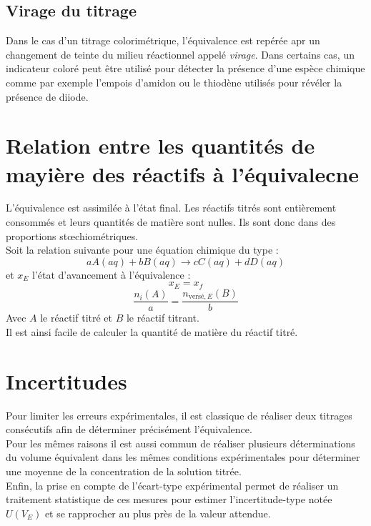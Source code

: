 \documentclass[a4paper,12pt,fleqn]{scrartcl}%
\begin{document}
    \subsection{Virage du titrage}
    Dans le cas d'un titrage colorimétrique, l'équivalence est repérée apr un changement de teinte du milieu réactionnel appelé \textit{virage}. Dans certains cas, un indicateur coloré peut être utilisé pour détecter la présence d'une espèce chimique comme par exemple l'empois d'amidon ou le thiodène utilisés pour révéler la présence de diiode.

\section{Relation entre les quantités de mayière des réactifs à l'équivalecne}
L'équivalence est assimilée à l'état final. Les réactifs titrés sont entièrement consommés et leurs quantités de matière sont nulles. Ils sont donc dans des proportions st\oe chiométriques.\\
Soit la relation suivante pour une équation chimique du type :
$$ aA(aq) + bB(aq) \rightarrow cC(aq) + dD(aq)$$
et $x_E$ l'état d'avancement à l'équivalence :
$$x_E = x_f $$
$$\dfrac{n_i(A)}{a} = \dfrac{n_{\text{versé},E}(B)}{b}$$
Avec $A$ le réactif titré et $B$ le réactif titrant.\\
Il est ainsi facile de calculer la quantité de matière du réactif titré.

\section{Incertitudes}
Pour limiter les erreurs expérimentales, il est classique de réaliser deux titrages consécutifs afin de déterminer précisément l'équivalence.\\
Pour les mêmes raisons il est aussi commun de réaliser plusieurs déterminations du volume équivalent dans les mêmes conditions expérimentales pour déterminer une moyenne de la concentration de la solution titrée.\\
Enfin, la prise en compte de l'écart-type expérimental permet de réaliser un traitement statistique de ces mesures pour estimer l'incertitude-type notée $U(V_E)$ et se rapprocher au plus près de la valeur attendue.
\end{document}
